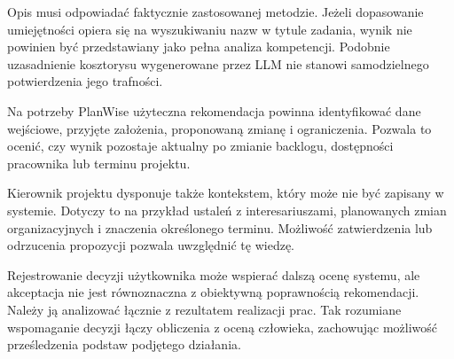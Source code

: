 Opis musi odpowiadać faktycznie zastosowanej metodzie. Jeżeli dopasowanie umiejętności opiera się na wyszukiwaniu nazw w tytule zadania, wynik nie powinien być przedstawiany jako pełna analiza kompetencji. Podobnie uzasadnienie kosztorysu wygenerowane przez LLM nie stanowi samodzielnego potwierdzenia jego trafności.

Na potrzeby PlanWise użyteczna rekomendacja powinna identyfikować dane wejściowe, przyjęte założenia, proponowaną zmianę i ograniczenia. Pozwala to ocenić, czy wynik pozostaje aktualny po zmianie backlogu, dostępności pracownika lub terminu projektu.

Kierownik projektu dysponuje także kontekstem, który może nie być zapisany w systemie. Dotyczy to na przykład ustaleń z interesariuszami, planowanych zmian organizacyjnych i znaczenia określonego terminu. Możliwość zatwierdzenia lub odrzucenia propozycji pozwala uwzględnić tę wiedzę.

Rejestrowanie decyzji użytkownika może wspierać dalszą ocenę systemu, ale akceptacja nie jest równoznaczna z obiektywną poprawnością rekomendacji. Należy ją analizować łącznie z rezultatem realizacji prac. Tak rozumiane wspomaganie decyzji łączy obliczenia z oceną człowieka, zachowując możliwość prześledzenia podstaw podjętego działania.